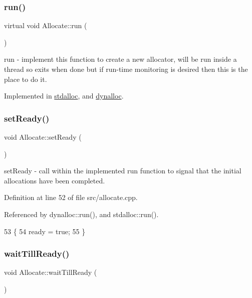 \subsubsection{\texorpdfstring{run()}{run()}}
{\footnotesize\ttfamily virtual void Allocate\+::run (\begin{DoxyParamCaption}{ }\end{DoxyParamCaption})\hspace{0.3cm}{\ttfamily [pure virtual]}}

run -\/ implement this function to create a new allocator, will be run inside a thread so exits when done but if run-\/time monitoring is desired then this is the place to do it. 

Implemented in \hyperlink{classstdalloc_a60438b15948ce354b52b03ba6d975de0}{stdalloc}, and \hyperlink{classdynalloc_a2a52b86ec09bd6dd52e49062137b2e37}{dynalloc}.

\hypertarget{class_allocate_a4cf36bb704e43f5736a0e736d9e1a81b}{}\label{class_allocate_a4cf36bb704e43f5736a0e736d9e1a81b} 
\subsubsection{\texorpdfstring{set\+Ready()}{setReady()}}
{\footnotesize\ttfamily void Allocate\+::set\+Ready (\begin{DoxyParamCaption}{ }\end{DoxyParamCaption})\hspace{0.3cm}{\ttfamily [protected]}}

set\+Ready -\/ call within the implemented run function to signal that the initial allocations have been completed. 

Definition at line 52 of file src/allocate.\+cpp.



Referenced by dynalloc\+::run(), and stdalloc\+::run().


\begin{DoxyCode}
53 \{
54    ready = \textcolor{keyword}{true};
55 \}
\end{DoxyCode}
\hypertarget{class_allocate_a3123c2c1d9584974ce19b47fe6ceea17}{}\label{class_allocate_a3123c2c1d9584974ce19b47fe6ceea17} 
\subsubsection{\texorpdfstring{wait\+Till\+Ready()}{waitTillReady()}}
{\footnotesize\ttfamily void Allocate\+::wait\+Till\+Ready (\begin{DoxyParamCaption}{ }\end{DoxyParamCaption})}

